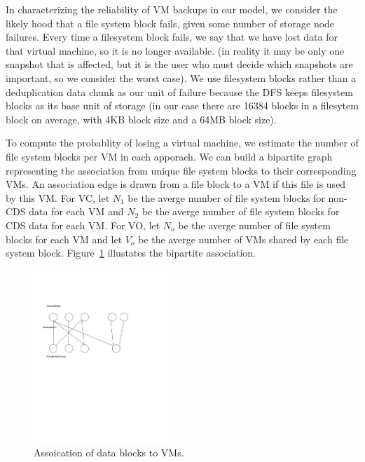 In characterizing the reliability of VM backups in our model, 
we consider the likely hood that a file system block fails,
given some number of storage node failures. 
Every time a filesystem block fails,
we say that we have lost data for that virtual machine, so it is no longer
available. 
(in reality it may be only one snapshot that is affected, but it is the user
who must decide which snapshots are important, so we consider the worst case). 
We use filesystem blocks rather than a deduplication
data chunk as our unit of failure because the DFS keeps
filesystem blocks as its base unit of storage (in our case there are 
16384 blocks in a filesytem block on average, with 4KB block size and 
a 64MB block size).

To  compute the probablity of losing a virtual machine, 
we estimate the number of file system blocks per VM in each apporach.
We can build a bipartite graph representing the association from unique file system blocks
to their corresponding VMs. An association edge is  drawn  from a file block  to a VM 
if this file is used by this VM. 
For VC, let $N_1$ be the averge number of file system blocks for non-CDS data for each VM
and  $N_2$ be the averge number of file system blocks for CDS data for each VM.
For VO, let $N_o$ be the averge number of file system blocks for each VM
and  let $V_o$ be the averge number of VMs shared by each file system block.
Figure~\ref{fig:shared} illustates the bipartite association.
\begin{figure}[htbp]
\centering
\includegraphics[width=0.45\textwidth]{shared.pdf}
\caption{Assoication of data blocks to VMs.}
\label{fig:shared}
\end{figure}

